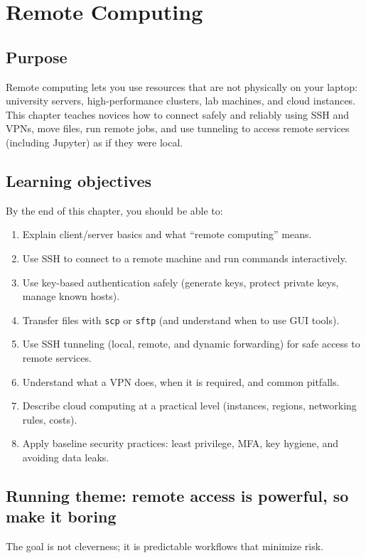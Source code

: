 \chapter{Remote Computing}
\label{ch:remote-computing}

\section*{Purpose}
Remote computing lets you use resources that are not physically on your laptop: university servers, high-performance clusters, lab machines, and cloud instances. This chapter teaches novices how to connect safely and reliably using SSH and VPNs, move files, run remote jobs, and use tunneling to access remote services (including Jupyter) as if they were local.

\section*{Learning objectives}
By the end of this chapter, you should be able to:
\begin{enumerate}
\item Explain client/server basics and what ``remote computing'' means.
\item Use SSH to connect to a remote machine and run commands interactively.
\item Use key-based authentication safely (generate keys, protect private keys, manage known hosts).
\item Transfer files with \texttt{scp} or \texttt{sftp} (and understand when to use GUI tools).
\item Use SSH tunneling (local, remote, and dynamic forwarding) for safe access to remote services.
\item Understand what a VPN does, when it is required, and common pitfalls.
\item Describe cloud computing at a practical level (instances, regions, networking rules, costs).
\item Apply baseline security practices: least privilege, MFA, key hygiene, and avoiding data leaks.
\end{enumerate}

\section*{Running theme: remote access is powerful, so make it boring}
The goal is not cleverness; it is predictable workflows that minimize risk.

